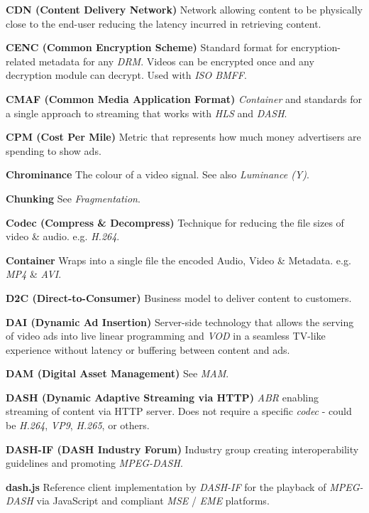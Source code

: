\smallskip
\textbf{CDN (Content Delivery Network)}
Network allowing content to be physically close to the end-user reducing the latency incurred in retrieving content.

\smallskip
\textbf{CENC (Common Encryption Scheme)}
Standard format for encryption-related metadata for any \textit{DRM}. Videos can be encrypted once and any decryption module can decrypt.  Used with \textit{ISO BMFF}.

\smallskip
\textbf{CMAF (Common Media Application Format)}
\textit{Container} and standards for a single approach to streaming that works with \textit{HLS} and \textit{DASH}.

\smallskip
\textbf{CPM (Cost Per Mile)}
Metric that represents how much money advertisers are spending to show ads.

\smallskip
\textbf{Chrominance}
The colour of a video signal. See also \textit{Luminance (Y)}.

\smallskip
\textbf{Chunking}
See \textit{Fragmentation}.

\smallskip
\textbf{Codec (Compress \& Decompress)}
Technique for reducing the file sizes of video \& audio. e.g. \textit{H.264}.

\smallskip
\textbf{Container}
Wraps into a single file the encoded Audio, Video \& Metadata.  e.g. \textit{MP4} \& \textit{AVI}.

\smallskip
\textbf{D2C (Direct-to-Consumer)}
Business model to deliver content to customers.

\smallskip
\textbf{DAI (Dynamic Ad Insertion)}
Server-side technology that allows the serving of video ads into live linear programming and \textit{VOD} in a seamless TV-like experience without latency or buffering between content and ads.

\smallskip
\textbf{DAM (Digital Asset Management)}
See \textit{MAM}.

\smallskip
\textbf{DASH (Dynamic Adaptive Streaming via HTTP)}
\textit{ABR} enabling streaming of content via HTTP server. Does not require a specific \textit{codec} - could be \textit{H.264}, \textit{VP9}, \textit{H.265}, or others.

\smallskip
\textbf{DASH-IF (DASH Industry Forum)}
Industry group creating interoperability guidelines and promoting \textit{MPEG-DASH}.

\smallskip
\textbf{dash.js}
Reference client implementation by \textit{DASH-IF} for the playback of \textit{MPEG-DASH} via JavaScript and compliant \textit{MSE} / \textit{EME} platforms.

